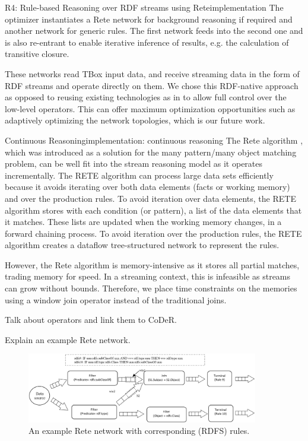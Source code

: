 \begin{nestedsection}{R4: Rule-based Reasoning over RDF streams using Rete}{implementation}
	The optimizer instantiates a Rete network for background reasoning if required and another network for generic rules.
	The first network feeds into the second one and is also re-entrant to enable iterative inference of results, e.g. the calculation of transitive closure.
	
	These networks read TBox input data, and receive streaming data in the form of RDF streams and operate directly on them.
	We chose this RDF-native approach as opposed to reusing existing technologies as in \citep{C-SPARQL,streaming-sparql} to allow full control over the low-level operators.
	This can offer maximum optimization opportunities such as adaptively optimizing the network topologies, which is our future work.

	\begin{nestedsection}{Continuous Reasoning}{implementation: continuous reasoning}
		The Rete algorithm \citep{forgy79}, which was introduced as a solution for the many pattern/many object matching problem, can be well fit into the stream reasoning model as it operates incrementally.
		The RETE algorithm can process large data sets efficiently because it avoids iterating over both data elements (facts or working memory) and over the production rules.
		To avoid iteration over data elements, the RETE algorithm stores with each condition (or pattern), a list of the data elements that it matches.
		These lists are updated when the working memory changes, in a forward chaining process.
		To avoid iteration over the production rules, the RETE algorithm creates a dataflow tree-structured network to represent the rules.
		
		However, the Rete algorithm is memory-intensive as it stores all partial matches, trading memory for speed.
		In a streaming context, this is infeasible as streams can grow without bounds.
		Therefore, we place time constraints on the memories using a window join operator instead of the traditional joins.

		Talk about operators and link them to CoDeR.

 		Explain an example Rete network.

 		\begin{figure}
 			\centering
 			\includegraphics[width=0.9\textwidth]{example-rete-network}
 			\caption{An example Rete network with corresponding (RDFS) rules.}
 		\end{figure}
	\end{nestedsection}
\end{nestedsection}